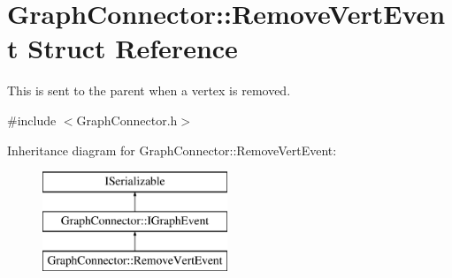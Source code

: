 \hypertarget{struct_graph_connector_1_1_remove_vert_event}{}\section{Graph\+Connector\+:\+:Remove\+Vert\+Event Struct Reference}
\label{struct_graph_connector_1_1_remove_vert_event}


This is sent to the parent when a vertex is removed.  




{\ttfamily \#include $<$Graph\+Connector.\+h$>$}

Inheritance diagram for Graph\+Connector\+:\+:Remove\+Vert\+Event\+:\begin{figure}[H]
\begin{center}
\leavevmode
\includegraphics[height=3.000000cm]{struct_graph_connector_1_1_remove_vert_event}
\end{center}
\end{figure}
